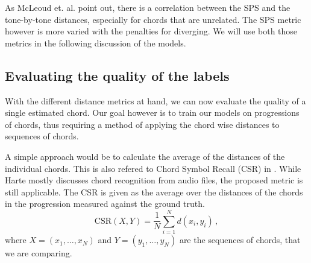 As McLeoud et. al. point out, there is a correlation between the SPS and the tone-by-tone distances, especially for chords that are unrelated. The SPS metric however is more varied with the penalties for diverging. We will use both those metrics in the following discussion of the models.

\subsection{Evaluating the quality of the labels}

With the different distance metrics at hand, we can now evaluate the quality of a single estimated chord. Our goal however is to train our models on progressions of chords, thus requiring a method of applying the chord wise distances to sequences of chords.

A simple approach would be to calculate the average of the distances of the individual chords. This is also refered to Chord Symbol Recall (CSR) in \cite{Harte2010TowardsAE}. While Harte mostly discusses chord recognition from audio files, the proposed metric is still applicable. The CSR is given as the average over the distances of the chords in the progression measured against the ground truth.
\[
    \mathrm{CSR}(X, Y) = \frac{1}{N} \sum_{i = 1}^{N} d(x_i, y_i)\,,
\]
where $ X = (x_1, \ldots, x_{N}) $ and $ Y = (y_1, \ldots, y_{N}) $ are the sequences of chords, that we are comparing.

